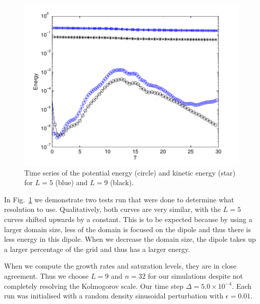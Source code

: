 \begin{figure}
\begin{center}
\includegraphics[width=\textwidth]{energy_test}
\caption{Time series of the potential energy (circle) and kinetic energy (star) for $L=5$ (blue) and $L=9$ (black).}
\label{test_energy}
\end{center}
\end{figure}
In Fig.~\ref{test_energy} we demonstrate two tests run that were done to determine what resolution to use. Qualitatively, both curves are very similar, with the $L=5$ curves shifted upwards by a constant. This is to be expected because by using a larger domain size, less of the domain is focused on the dipole and thus there is less energy in this dipole. When we decrease the domain size, the dipole takes up a larger percentage of the grid and thus has a larger energy. 

When we compute the growth rates and saturation levels, they are in close agreement. Thus we choose $L=9$ and $n=32$ for our simulations despite not completely resolving the Kolmogorov scale. Our time step $\Delta = 5.0\times 10^{-4}$. Each run was initialised with a random density sinusoidal perturbation with $\epsilon=0.01$. 

